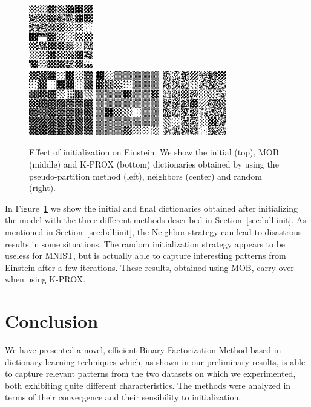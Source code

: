 \documentclass[twocolumn]{IEEEtran}
\theoremstyle{definition}
\begin{document}
\begin{figure}[t]
\includegraphics[height=1.1in]{fig/einstein_init_rand1.png}\\%
\includegraphics[height=1.1in]{fig/einstein_init_part1_kprox.png} %
\includegraphics[height=1.1in]{fig/einstein_init_neigh1_kprox.png} %
\includegraphics[height=1.1in]{fig/einstein_init_rand1_kprox.png}%
\caption{\label{fig:init} Effect of initialization on Einstein. We show the initial (top), MOB (middle) and K-PROX (bottom) dictionaries obtained by using the pseudo-partition method (left), neighbors (center) and random (right).}
\end{figure}
%
In Figure~\ref{fig:init} we show the initial and final dictionaries obtained after initializing the model with the three different methods described in Section~\ref{sec:bdl:init}. As mentioned in Section~\ref{sec:bdl:init}, the Neighbor strategy can lead to disastrous results in some situations. The random initialization strategy appears to be useless for MNIST, but is actually able to capture interesting patterns from Einstein after a few iterations. These results, obtained using MOB, carry over when using K-PROX.

\section{Conclusion}
\label{sec:conclusion}

We have presented a novel, efficient Binary Factorization Method based in dictionary learning techniques which, as shown in our preliminary results, is able to capture relevant patterns from the two datasets on which we experimented, both exhibiting quite different characteristics. The methods were analyzed in terms of their convergence and their sensibility to initialization. 



\end{document}
